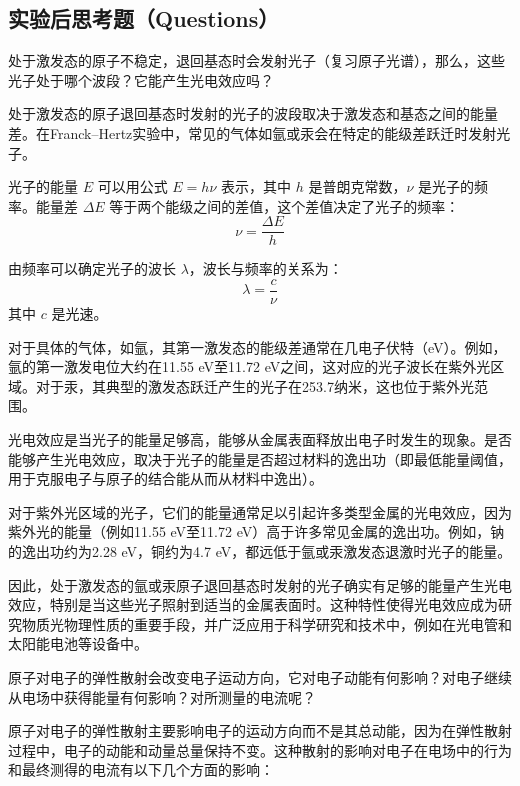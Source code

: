 \documentclass[dvipsnames, svgnames,a4paper,11pt]{article}
\begin{document}
	
	\subsection{实验后思考题（Questions）}
	
	\begin{question}
		处于激发态的原子不稳定，退回基态时会发射光子（复习原子光谱），那么，这些光子处于哪个波段？它能产生光电效应吗？
	\end{question}
	处于激发态的原子退回基态时发射的光子的波段取决于激发态和基态之间的能量差。在Franck–Hertz实验中，常见的气体如氩或汞会在特定的能级差跃迁时发射光子。
	
	光子的能量 \( E \) 可以用公式 \( E = h \nu \) 表示，其中 \( h \) 是普朗克常数，\( \nu \) 是光子的频率。能量差 \( \Delta E \) 等于两个能级之间的差值，这个差值决定了光子的频率：\[ \nu = \frac{\Delta E}{h} \]
	
	由频率可以确定光子的波长 \( \lambda \)，波长与频率的关系为：\[ \lambda = \frac{c}{\nu} \]
	其中 \( c \) 是光速。
	
	对于具体的气体，如氩，其第一激发态的能级差通常在几电子伏特（eV）。例如，氩的第一激发电位大约在11.55 eV至11.72 eV之间，这对应的光子波长在紫外光区域。对于汞，其典型的激发态跃迁产生的光子在253.7纳米，这也位于紫外光范围。
	
	光电效应是当光子的能量足够高，能够从金属表面释放出电子时发生的现象。是否能够产生光电效应，取决于光子的能量是否超过材料的逸出功（即最低能量阈值，用于克服电子与原子的结合能从而从材料中逸出）。
	
	对于紫外光区域的光子，它们的能量通常足以引起许多类型金属的光电效应，因为紫外光的能量（例如11.55 eV至11.72 eV）高于许多常见金属的逸出功。例如，钠的逸出功约为2.28 eV，铜约为4.7 eV，都远低于氩或汞激发态退激时光子的能量。
	
	因此，处于激发态的氩或汞原子退回基态时发射的光子确实有足够的能量产生光电效应，特别是当这些光子照射到适当的金属表面时。这种特性使得光电效应成为研究物质光物理性质的重要手段，并广泛应用于科学研究和技术中，例如在光电管和太阳能电池等设备中。
	
	
	\begin{question}
		原子对电子的弹性散射会改变电子运动方向，它对电子动能有何影响？对电子继续从电场中获得能量有何影响？对所测量的电流呢？
	\end{question}
	原子对电子的弹性散射主要影响电子的运动方向而不是其总动能，因为在弹性散射过程中，电子的动能和动量总量保持不变。这种散射的影响对电子在电场中的行为和最终测得的电流有以下几个方面的影响：
	
\end{document}
